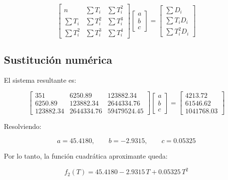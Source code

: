 \documentclass[12pt,a4paper]{article}
\begin{document}
\[
\begin{bmatrix}
n & \sum T_i & \sum T_i^2 \\
\sum T_i & \sum T_i^2 & \sum T_i^3 \\
\sum T_i^2 & \sum T_i^3 & \sum T_i^4
\end{bmatrix}
\begin{bmatrix}
a \\
b \\
c
\end{bmatrix}
=
\begin{bmatrix}
\sum D_i \\
\sum T_iD_i \\
\sum T_i^2D_i
\end{bmatrix}
\]

\subsection{Sustitución numérica}

\begin{table}[H]
\centering
\caption{Sumas utilizadas en el ajuste cuadrático}

\end{table}

El sistema resultante es:

\[
\begin{bmatrix}
\num{351} & \num{6250.89} & \num{123882.34} \\
\num{6250.89} & \num{123882.34} & \num{2644334.76} \\
\num{123882.34} & \num{2644334.76} & \num{59479524.45}
\end{bmatrix}
\begin{bmatrix}
a \\
b \\
c
\end{bmatrix}
=
\begin{bmatrix}
\num{4213.72} \\
\num{61546.62} \\
\num{1041768.03}
\end{bmatrix}
\]

Resolviendo:

\[
    a = \boxed{\num{45.4180}},
    \qquad
    b = \boxed{\num{-2.9315}},
    \qquad
    c = \boxed{\num{0.05325}}
\]

Por lo tanto, la función cuadrática aproximante queda:

\[
    f_2(T)=\boxed{\num{45.4180} - \num{2.9315}\,T + \num{0.05325}\,T^2}
\]

\end{document}

